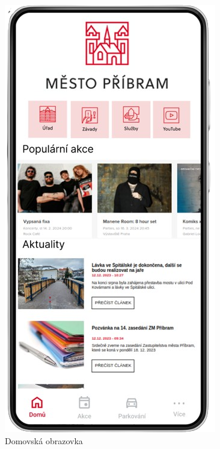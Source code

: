 \begin{figure}[H]
      \includegraphics[width=\linewidth]{screen1.png}
      \caption{Domovská obrazovka}\label{fig:screen1}
    \endminipage\hfill

\end{figure}
